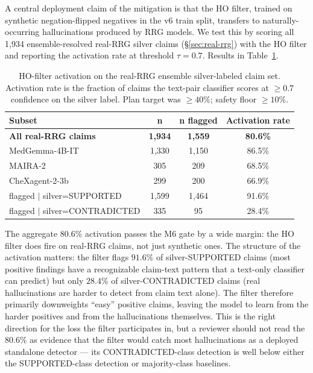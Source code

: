 \documentclass[pmlr]{jmlr}
\begin{document}
A central deployment claim of the mitigation is that the HO filter, trained on synthetic negation-flipped negatives in the v6 train split, transfers to naturally-occurring hallucinations produced by RRG models. We test this by scoring all 1{,}934 ensemble-resolved real-RRG silver claims (§\ref{sec:real-rrg}) with the HO filter and reporting the activation rate at threshold $\tau=0.7$. Results in Table~\ref{tab:ho-rrg-activation}.

\begin{table}[t]
\centering
\small
\caption{HO-filter activation on the real-RRG ensemble silver-labeled claim set. Activation rate is the fraction of claims the text-pair classifier scores at $\geq 0.7$ confidence on the silver label. Plan target was $\geq 40\%$; safety floor $\geq 10\%$.}
\label{tab:ho-rrg-activation}
\begin{tabular}{lccc}
\toprule
\textbf{Subset} & \textbf{n} & \textbf{n flagged} & \textbf{Activation rate} \\
\midrule
\textbf{All real-RRG claims} & \textbf{1{,}934} & \textbf{1{,}559} & \textbf{80.6\%} \\
MedGemma-4B-IT  & 1{,}330 & 1{,}150 &  86.5\% \\
MAIRA-2         & 305    & 209    & 68.5\% \\
CheXagent-2-3b  & 299    & 200    & 66.9\% \\
\midrule
flagged $|$ silver=SUPPORTED   & 1{,}599 & 1{,}464 & 91.6\% \\
flagged $|$ silver=CONTRADICTED & 335     & 95      & 28.4\% \\
\bottomrule
\end{tabular}
\end{table}

The aggregate $80.6\%$ activation passes the M6 gate by a wide margin: the HO filter does fire on real-RRG claims, not just synthetic ones. The structure of the activation matters: the filter flags $91.6\%$ of silver-SUPPORTED claims (most positive findings have a recognizable claim-text pattern that a text-only classifier can predict) but only $28.4\%$ of silver-CONTRADICTED claims (real hallucinations are harder to detect from claim text alone). The filter therefore primarily downweights ``easy'' positive claims, leaving the model to learn from the harder positives and from the hallucinations themselves. This is the right direction for the loss the filter participates in, but a reviewer should not read the $80.6\%$ as evidence that the filter would catch most hallucinations as a deployed standalone detector — its CONTRADICTED-class detection is well below either the SUPPORTED-class detection or majority-class baselines.
\end{document}
